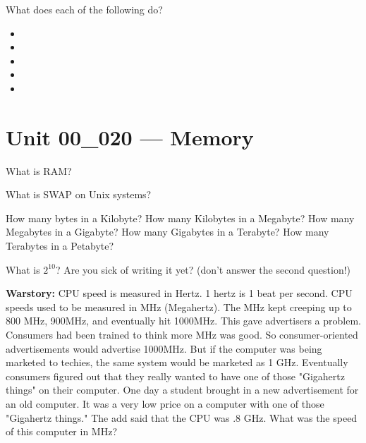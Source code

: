 \documentclass[letterpaper,12pt]{exam}
\newcommand{\unit}{Unit 00}
\begin{document}
\begin{questions}
\begin{samepage}
\question What does each of the following do? 
\begin{itemize}
\item {}
\vspace{5mm}
\item {}
\vspace{5mm}
\item {}
\vspace{5mm}
\item {}
\vspace{5mm}
\item {}
\vspace{5mm}
\end{itemize}
\end{samepage}

\section*{\unit\_020 --- Memory}

\begin{samepage}
\question What is RAM? 
\vspace{5mm}
\end{samepage}

\question What is SWAP on Unix systems?
\begin{samepage}
\question How many bytes in a Kilobyte?
\question How many Kilobytes in a Megabyte?
\question How many Megabytes in a Gigabyte?
\question How many Gigabytes in a Terabyte?
\question How many Terabytes in a Petabyte?
\end{samepage}

\question What is $2^{10}$?  Are you sick of writing it yet? (don't answer the second question!)
\vspace{20mm}
\begin {samepage}

\noindent \textbf{Warstory:}  CPU speed is measured in Hertz.  1 hertz is 1 beat per second.  CPU speeds used to be measured in MHz (Megahertz).  The MHz kept creeping up to 800 MHz, 900MHz, and eventually hit 1000MHz.  This gave advertisers a problem.  Consumers had been trained to think more MHz was good.  So consumer-oriented advertisements would advertise 1000MHz.  But if the computer was being marketed to techies, the same system would be marketed as 1 GHz.  Eventually consumers figured out that they really wanted to have one of those "Gigahertz things" on their computer.  
\question One day a student brought in a new advertisement for an old computer.  It was a very low price on a computer with one of those "Gigahertz things."  The add said that the CPU was .8 GHz.   What was the speed of this computer in MHz?
\vspace{15mm}


\end{samepage}
\end{questions}
\end{document}

